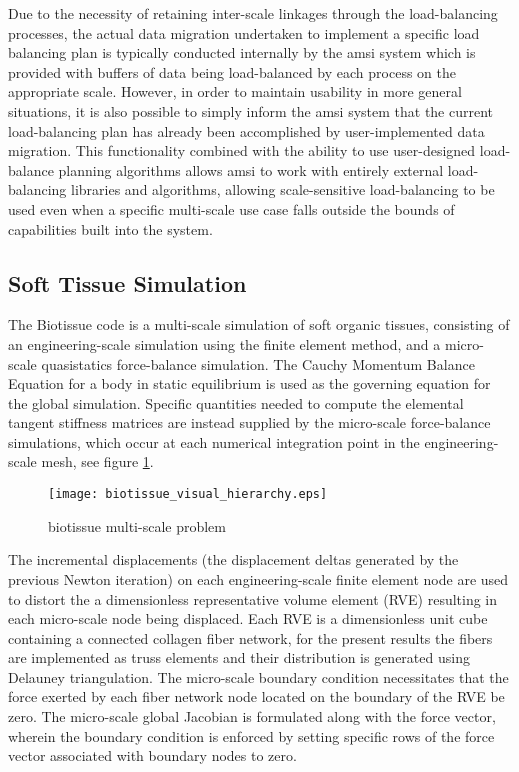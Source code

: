 \documentclass[11pt]{siamltex1213}
\begin{document}
Due to the necessity of retaining inter-scale linkages through the load-balancing processes, the actual data migration undertaken to implement a specific load balancing plan is typically conducted internally by the amsi system which is provided with buffers of data being load-balanced by each process on the appropriate scale. However, in order to maintain usability in more general situations, it is also possible to simply inform the amsi system that the current load-balancing plan has already been accomplished by user-implemented data migration. This functionality combined with the ability to use user-designed load-balance planning algorithms allows amsi to work with entirely external load-balancing libraries and algorithms, allowing scale-sensitive load-balancing to be used even when a specific multi-scale use case falls outside the bounds of capabilities built into the system.

\subsection{Soft Tissue Simulation}\label{biotissue}

The Biotissue code is a multi-scale simulation of soft organic tissues, consisting of an engineering-scale simulation using the finite element method, and a micro-scale quasistatics force-balance simulation. The Cauchy Momentum Balance Equation for a body in static equilibrium is used as the governing equation for the global simulation. Specific quantities needed to compute the elemental tangent stiffness matrices are instead supplied by the micro-scale force-balance simulations, which occur at each numerical integration point in the engineering-scale mesh, see figure \ref{biotissue_hierarchy}. 

\begin{figure}
  \begin{center}
    \texttt{[image: biotissue\_visual\_hierarchy.eps]}
  \end{center}

  \caption{\small biotissue multi-scale problem}
  \label{biotissue_hierarchy}
\end{figure}

The incremental displacements (the displacement deltas generated by the previous Newton iteration) on each engineering-scale finite element node are used to distort the a dimensionless representative volume element (RVE) resulting in each micro-scale node being displaced. Each RVE is a dimensionless unit cube containing a connected collagen fiber network, for the present results the fibers are implemented as truss elements and their distribution is generated using Delauney triangulation. The micro-scale boundary condition necessitates that the force exerted by each fiber network node located on the boundary of the RVE be zero. The micro-scale global Jacobian is formulated along with the force vector, wherein the boundary condition is enforced by setting specific rows of the force vector associated with boundary nodes to zero. 
\end{document}
